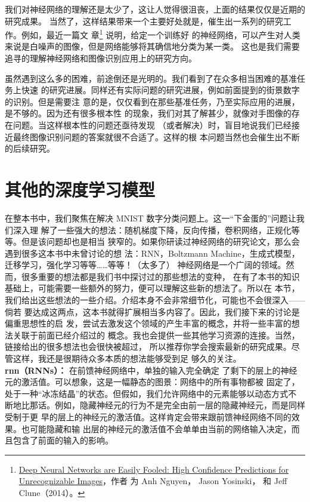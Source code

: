 我们对神经网络的理解还是太少了，这让人觉得很沮丧，上面的结果仅仅是近期的研究成果。
当然了，这样结果带来一个主要好处就是，催生出一系列的研究工作。例如，最近一篇文
章\footnote{\href{http://arxiv.org/abs/1412.1897}{Deep Neural Networks are
    Easily Fooled: High Confidence Predictions for Unrecognizable Images}，作者
  为 Anh Nguyen， Jason Yosinski， 和 Jeff Clune（2014）。} 说明，给定一个训练好
的神经网络，可以产生对人类来说是白噪声的图像，但是网络能够将其确信地分类为某一类。
这也是我们需要追寻的理解神经网络和图像识别应用上的研究方向。

虽然遇到这么多的困难，前途倒还是光明的。我们看到了在众多相当困难的基准任务上快速
的研究进展。同样还有实际问题的研究进展，例如前面提到的街景数字的识别。但是需要注
意的是，仅仅看到在那些基准任务，乃至实际应用的进展，是不够的。因为还有很多根本性
的现象，我们对其了解甚少，就像对手图像的存在问题。当这样根本性的问题还亟待发现
（或者解决）时，盲目地说我们已经接近最终图像识别问题的答案就很不合适了。这样的根
本问题当然也会催生出不断的后续研究。

\section{其他的深度学习模型}
\label{sec:other_approaches_to_deep_neural_nets}

在整本书中，我们聚焦在解决 MNIST 数字分类问题上。这一“下金蛋的”问题让我们深入理
解了一些强大的想法：随机梯度下降，反向传播，卷积网络，正规化等等。但是该问题却也是相当
狭窄的。如果你研读过神经网络的研究论文，那么会遇到很多这本书中未曾讨论的想
法：RNN，Boltzmann Machine，生成式模型，迁移学习，强化学习等等……等等！（太多了）
神经网络是一个广阔的领域。然而，很多重要的想法都是我们书中探讨过的那些想法的变种，
在有了本书的知识基础上，可能需要一些额外的努力，便可以理解这些新的想法了。所以在
本节，我们给出这些想法的一些介绍。介绍本身不会非常细节化，可能也不会很深入——倘若
要达成这两点，这本书就得扩展相当多内容了。因此，我们接下来的讨论是偏重思想性的启
发，尝试去激发这个领域的产生丰富的概念，并将一些丰富的想法关联于前面已经介绍过的
概念。我也会提供一些其他学习资源的连接。当然，链接给出的很多想法也会很快被超过，
所以推荐你学会搜索最新的研究成果。尽管这样，我还是很期待众多本质的想法能够受到足
够久的关注。\\

	\textbf{\gls*{rnn}（RNNs）：} 在前馈神经网络中，单独的输入完全确定
了剩下的层上的神经元的激活值。可以想象，这是一幅静态的图景：网络中的所有事物都被
固定了，处于一种“冰冻结晶”的状态。但假如，我们允许网络中的元素能够以动态方式不
断地比那话。例如，隐藏神经元的行为不是完全由前一层的隐藏神经元，而是同样受制于更
早的层上的神经元的激活值。这样肯定会带来跟前馈神经网络不同的效果。也可能隐藏和输
出层的神经元的激活值不会单单由当前的网络输入决定，而且包含了前面的输入的影响。


